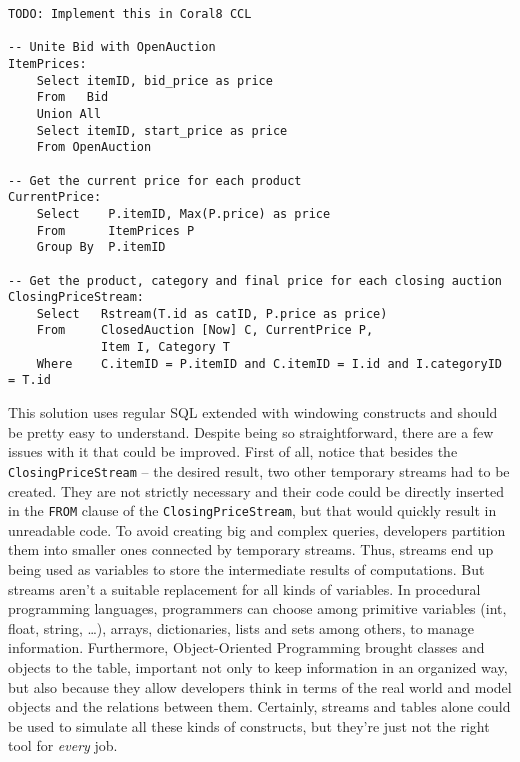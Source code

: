 \documentclass{report}
\begin{document}
\begin{verbatim}
TODO: Implement this in Coral8 CCL

-- Unite Bid with OpenAuction
ItemPrices:
    Select itemID, bid_price as price 
    From   Bid 
    Union All
    Select itemID, start_price as price 
    From OpenAuction

-- Get the current price for each product
CurrentPrice: 
    Select    P.itemID, Max(P.price) as price
    From      ItemPrices P
    Group By  P.itemID

-- Get the product, category and final price for each closing auction
ClosingPriceStream:
    Select   Rstream(T.id as catID, P.price as price)
    From     ClosedAuction [Now] C, CurrentPrice P, 
             Item I, Category T    
    Where    C.itemID = P.itemID and C.itemID = I.id and I.categoryID = T.id 
\end{verbatim}

This solution uses regular SQL extended with windowing constructs and
should be pretty easy to understand. Despite being so straightforward,
there are a few issues with it that could be improved. First of all,
notice that besides the \verb=ClosingPriceStream= -- the desired
result, two other temporary streams had to be created. They are not
strictly necessary and their code could be directly inserted in the
\verb=FROM= clause of the \verb=ClosingPriceStream=, but that would
quickly result in unreadable code. To avoid creating big and complex
queries, developers partition them into smaller ones connected by
temporary streams. Thus, streams end up being used as variables to
store the intermediate results of computations. But streams aren't a
suitable replacement for all kinds of variables. In procedural
programming languages, programmers can choose among primitive
variables (int, float, string, \dots), arrays, dictionaries, lists and
sets among others, to manage information. Furthermore, Object-Oriented
Programming brought classes and objects to the table, important not
only to keep information in an organized way, but also because they
allow developers think in terms of the real world and model objects
and the relations between them. Certainly, streams and tables alone
could be used to simulate all these kinds of constructs, but they're
just not the right tool for \emph{every} job.
\end{document}
